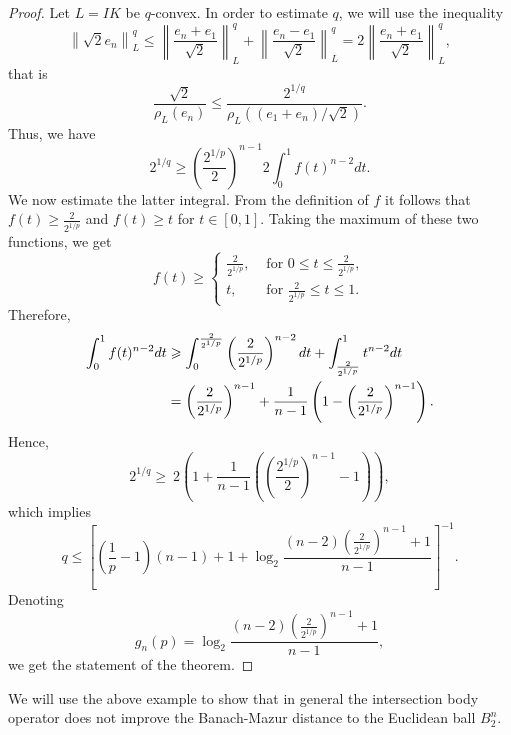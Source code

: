 \documentclass[12pt]{amsart} %
\renewcommand{\[}{\left[}
\renewcommand{\(}{\left(}
\renewcommand{\]}{\right]}
\renewcommand{\)}{\right)}
\renewcommand{\le}{\leqslant}
\renewcommand{\ge}{\geqslant}
\begin{document}
\begin{proof}
Let  $L=IK$ be $q$-convex. In order to estimate $q$, we will  use the inequality
$$\left\|\sqrt{2} e_n\right\|_L^q\le \left\|\frac{e_n+e_1}{\sqrt{2}}\right\|_L^q+ \left\|\frac{e_n-e_1}{\sqrt{2}}\right\|_L^q = 2 \left\|\frac{e_n+e_1}{\sqrt{2}}\right\|_L^q,$$ that is
$$\frac{\sqrt{2}}{\rho_L(e_n)} \le \frac{2^{1/q}}{\rho_L((e_1+e_n)/\sqrt{2} )} .$$
Thus, we have %
$$2^{1/q}\ge \left(\frac{2^{1/p}}{2}\right)^{n-1} 2  { \int_0^1 f(t)^{n-2} dt }  . $$
We now  estimate the latter integral.
From the definition of $f$ it follows that $f(t)\ge \frac{2}{2^{1/p}}$ and $f(t)\ge  t $ for $t\in [0,1]$. Taking the maximum of these two functions, we get   $$\displaystyle f(t) \ge \left\{\begin{array}{ll}\frac{2}{2^{1/p}},& \mbox{ for } 0\le t \le \frac{2}{2^{1/p}},\\
t,& \mbox{ for }   \frac{2}{2^{1/p}} \le t\le 1. \end{array} \right.$$
Therefore, \begin{align}\label{intf} \int_0^1 f(t)^{n-2} dt&\ge\int_0^{\frac{2}{2^{1/p}}}\left(\frac{2}{2^{1/p}}\right)^{n-2} dt +  \int_{\frac{2}{2^{1/p}}}^1 t^{n-2} dt\\\notag &=\left(\frac{2}{2^{1/p}}\right)^{n-1}+\frac{1}{n-1}\left(1 - \left(\frac{2}{2^{1/p}}\right)^{n-1} \right).\end{align}
 Hence,
 $$2^{1/q}\ge \ 2    \left(1+\frac{1}{n-1}\left(\left(\frac{2^{1/p}}{2}\right)^{n-1} - 1\right)  \right) , $$
which implies $$q\le \left[\left(\frac1p-1\right)(n-1)+1+\log_2\frac{(n-2)\left(\frac{2}{2^{1/p}}\right)^{n-1}+1}{n-1}\right]^{-1}.$$
Denoting $$g_n(p)=\log_2\frac{(n-2)\left(\frac{2}{2^{1/p}}\right)^{n-1}+1}{n-1},$$
we get the statement of the theorem.





\end{proof}


We will use the above example to show that in general  the intersection body operator does not improve the Banach-Mazur distance to the Euclidean ball $B_2^n$.
\end{document}
